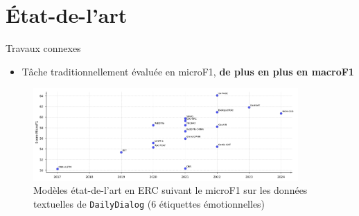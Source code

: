 \documentclass[11pt,aspectratio=169]{beamer}
\begin{document}
\section{État-de-l'art}

\begin{frame}{Travaux connexes}
    \begin{itemize}
        \item Tâche traditionnellement évaluée en microF1, \textcolor{roose}{\bf de plus en plus en macroF1}
    \end{itemize}
    \begin{figure}
        \centering
        \includegraphics[width=0.9\textwidth]{sota-chrono-plot.png}
        \caption{\centering Modèles état-de-l'art en ERC suivant le microF1 sur les données textuelles de \texttt{DailyDialog} (6 étiquettes émotionnelles)}
    \end{figure}
\end{frame}
\end{document}
